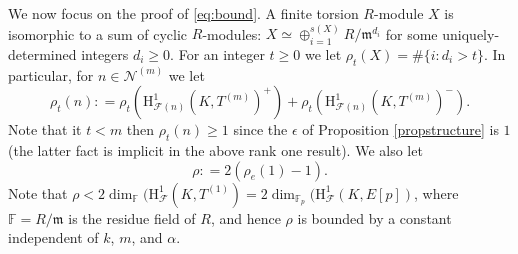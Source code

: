 \documentclass[a4paper,10pt]{amsart}
\numberwithin{equation}{section}
\numberwithin{equation}{section}
\theoremstyle{plain}
\theoremstyle{definition}
\theoremstyle{definition}
\theoremstyle{plain}
\theoremstyle{plain}
\theoremstyle{plain}
\theoremstyle{plain}
\DeclareMathOperator{\ord}{ord}
\newcommand{\ind}{\operatorname{ind}}
\newcommand{\Z}{\mathbb{Z}}
\newcommand{\F}{\mathcal{F}}
\newcommand{\Fcal}{\mathcal{F}}
\newcommand{\cN}{\mathscr{N}}
\newcommand{\fm}{\mathfrak{m}}
\newcommand{\rH}{\mathrm{H}}
\begin{document}
We now focus on the proof of \eqref{eq:bound}. 
%
A finite torsion $R$-module $X$ is isomorphic to a sum of cyclic $R$-modules:  $X \simeq \oplus_{i=1}^{s(X)} R/\fm^{d_i}$ for some uniquely-determined
integers $d_i\geq 0$. For an integer $t\geq 0$ we let $\rho_t(X)= \# \{i: d_i > t\}$.  In particular, for $n\in\cN^{(m)}$ we let
\[
\rho_t(n): = \rho_t(\rH^1_{\F(n)}(K, T^{(m)})^+) + \rho_t(\rH^1_{\F(n)}(K,T^{(m)})^-).
\]
Note that it $t<m$ then $\rho_t(n)\geq 1$ since the $\epsilon$ of Proposition \ref{propstructure} is $1$ (the latter fact is implicit in the above rank one result).
We also let
$$
\rho: = 2(\rho_e(1)-1).
$$
Note that $\rho< 2\dim_\mathbb{F}(\rH^1_{\Fcal}(K,T^{(1)}) = 2\dim_{\mathbb F_p}(\rH^1_\Fcal(K,E[p])$, where $\mathbb{F}= R/\fm$ is the residue field of $R$, and hence $\rho$ is bounded by a constant independent of $k$, $m$, and $\alpha$. 


\end{document}
